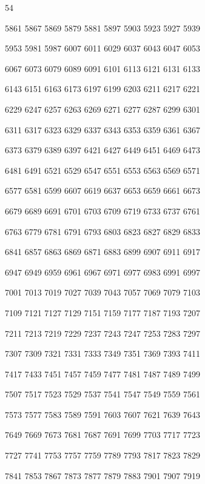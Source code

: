 \documentclass{article}
\begin{document}

54

5861   5867   5869   5879   5881   5897   5903   5923   5927   5939 

   5953   5981   5987   6007   6011   6029   6037   6043   6047   6053 

   6067   6073   6079   6089   6091   6101   6113   6121   6131   6133 

   6143   6151   6163   6173   6197   6199   6203   6211   6217   6221 

   6229   6247   6257   6263   6269   6271   6277   6287   6299   6301 

   6311   6317   6323   6329   6337   6343   6353   6359   6361   6367 

   6373   6379   6389   6397   6421   6427   6449   6451   6469   6473 

   6481   6491   6521   6529   6547   6551   6553   6563   6569   6571 

   6577   6581   6599   6607   6619   6637   6653   6659   6661   6673 

   6679   6689   6691   6701   6703   6709   6719   6733   6737   6761 

   6763   6779   6781   6791   6793   6803   6823   6827   6829   6833 

   6841   6857   6863   6869   6871   6883   6899   6907   6911   6917 

   6947   6949   6959   6961   6967   6971   6977   6983   6991   6997 

   7001   7013   7019   7027   7039   7043   7057   7069   7079   7103 

   7109   7121   7127   7129   7151   7159   7177   7187   7193   7207

   7211   7213   7219   7229   7237   7243   7247   7253   7283   7297 

   7307   7309   7321   7331   7333   7349   7351   7369   7393   7411 

   7417   7433   7451   7457   7459   7477   7481   7487   7489   7499 

   7507   7517   7523   7529   7537   7541   7547   7549   7559   7561 

   7573   7577   7583   7589   7591   7603   7607   7621   7639   7643 

   7649   7669   7673   7681   7687   7691   7699   7703   7717   7723 

   7727   7741   7753   7757   7759   7789   7793   7817   7823   7829 

   7841   7853   7867   7873   7877   7879   7883   7901   7907   7919
\end{document}
